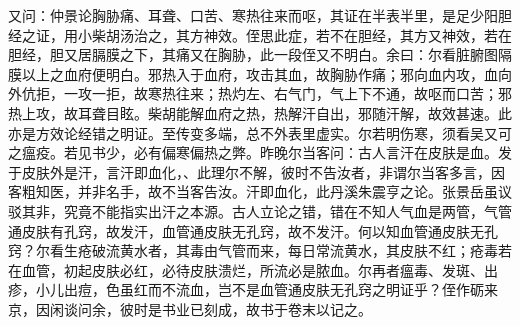 \documentclass[a4paper,12pt,UTF8,twoside]{ctexbook}
\begin{document}
	又问：仲景论胸胁痛、耳聋、口苦、寒热往来而呕，其证在半表半里，是足少阳胆经之证，用小柴胡汤治之，其方神效。侄思此症，若不在胆经，其方又神效，若在胆经，胆又居膈膜之下，其痛又在胸胁，此一段侄又不明白。余曰：尔看脏腑图隔膜以上之血府便明白。邪热入于血府，攻击其血，故胸胁作痛；邪向血内攻，血向外伉拒，一攻一拒，故寒热往来；热灼左、右气门，气上下不通，故呕而口苦；邪热上攻，故耳聋目眩。柴胡能解血府之热，热解汗自出，邪随汗解，故效甚速。此亦是方效论经错之明证。至传变多端，总不外表里虚实。尔若明伤寒，须看吴又可之瘟疫。若见书少，必有偏寒偏热之弊。昨晚尔当客问：古人言汗在皮肤是血。发于皮肤外是汗，言汗即血化，、此理尔不解，彼时不告汝者，非谓尔当客多言，因客粗知医，并非名手，故不当客告汝。汗即血化，此丹溪朱震亨之论。张景岳虽议驳其非，究竟不能指实出汗之本源。古人立论之错，错在不知人气血是两管，气管通皮肤有孔窍，故发汗，血管通皮肤无孔窍，故不发汗。何以知血管通皮肤无孔窍？尔看生疮破流黄水者，其毒由气管而来，每日常流黄水，其皮肤不红；疮毒若在血管，初起皮肤必红，必待皮肤溃烂，所流必是脓血。尔再者瘟毒、发斑、出疹，小儿出痘，色虽红而不流血，岂不是血管通皮肤无孔窍之明证乎？侄作砺来京，因闲谈问余，彼时是书业已刻成，故书于卷末以记之。
	
	
\end{document}
